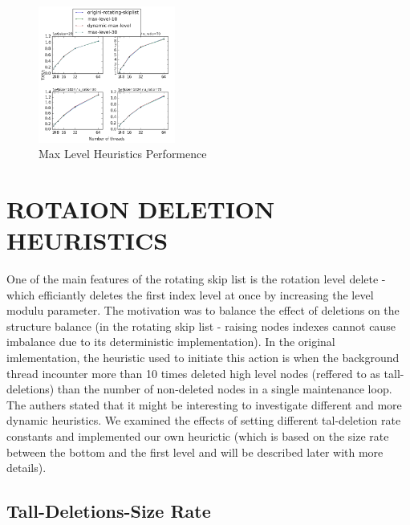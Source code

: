 \documentclass{article}
\begin{document}
\begin{figure}
	\caption{Max Level Heuristics Performence}
	\centering
	\includegraphics[width=0.4\textwidth]{max-level_plot}
\end{figure}


\section{ROTAION DELETION HEURISTICS}
\label{sec:rdh}

One of the main features of the rotating skip list is the rotation level delete - which efficiantly deletes the first index level at once by increasing the level modulu parameter. The motivation was to balance the effect of deletions on the structure balance (in the rotating skip list - raising nodes indexes cannot cause imbalance due to its deterministic implementation). In the original imlementation, the heuristic used to initiate this action is when the background thread incounter more than 10 times deleted high level nodes (reffered to as tall-deletions) than the number of non-deleted nodes in a single maintenance loop. The authers stated that it might be interesting to investigate different and more dynamic heuristics. We examined the effects of setting different tal-deletion rate constants and implemented our own heurictic (which is based on the size rate between the bottom and the first level and will be described later with more details).

\subsection{Tall-Deletions-Size Rate}
\label{ssec:tds}
\end{document}

